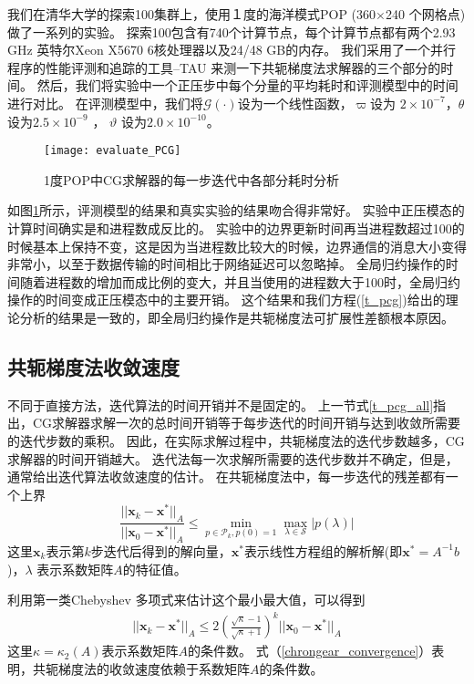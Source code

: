  
我们在清华大学的探索100集群上，使用１度的海洋模式POP (360$\times$240 个网格点)做了一系列的实验。 
探索100包含有740个计算节点，每个计算节点都有两个2.93 GHz 英特尔Xeon X5670 6核处理器以及24/48 GB的内存。 
我们采用了一个并行程序的性能评测和追踪的工具--TAU\cite{shende2006tau} 来测一下共轭梯度法求解器的三个部分的时间。 
然后，我们将实验中一个正压步中每个分量的平均耗时和评测模型中的时间进行对比。 
在评测模型中，我们将$\mathcal{G}(\cdot)$设为一个线性函数，$\varpi$设为 $2\times 10^{-7}$，$\theta$ 设为$2.5\times 10^{-9}$ ， $\vartheta$  设为$2.0\times 10^{-10}$。 


\begin{figure}[ht]
\centering
\texttt{[image: evaluate\_PCG]}
\caption[] {1度POP中CG求解器的每一步迭代中各部分耗时分析\label{fig:pcg_ratio}}
\end{figure}
如图\ref{fig:pcg_ratio}所示，评测模型的结果和真实实验的结果吻合得非常好。 
实验中正压模态的计算时间确实是和进程数成反比的。 
实验中的边界更新时间再当进程数超过100的时候基本上保持不变，这是因为当进程数比较大的时候，边界通信的消息大小变得非常小，以至于数据传输的时间相比于网络延迟可以忽略掉。 
全局归约操作的时间随着进程数的增加而成比例的变大，并且当使用的进程数大于100时，全局归约操作的时间变成正压模态中的主要开销。 
这个结果和我们方程(\ref{t_pcg})给出的理论分析的结果是一致的，即全局归约操作是共轭梯度法可扩展性差额根本原因。 

\subsection{共轭梯度法收敛速度} \label{solver:CG:convergence_rate}

不同于直接方法，迭代算法的时间开销并不是固定的。
上一节式\ref{t_pcg_all}指出，CG求解器求解一次的总时间开销等于每步迭代的时间开销与达到收敛所需要的迭代步数的乘积。
因此，在实际求解过程中，共轭梯度法的迭代步数越多，CG求解器的时间开销越大。 
迭代法每一次求解所需要的迭代步数并不确定，但是，通常给出迭代算法收敛速度的估计。
在共轭梯度法中，每一步迭代的残差都有一个上界\cite{Liesen2004}
\begin{equation}
\frac{||\textbf{x}_k-\textbf{x}^*||_A }{||\textbf{x}_0-\textbf{x}^*||_A}  \le \min_{p\in \mathcal{P}_k, p(0) = 1 }\max_{\lambda \in \mathcal{S}} |p(\lambda)| \label{PcgConvergeRate}
\end{equation}
这里$\textbf{x}_k$表示第$k$步迭代后得到的解向量，$\textbf{x}^*$表示线性方程组的解析解(即$\textbf{x}^* = A^{-1}b$)，$\lambda$ 表示系数矩阵$A$的特征值。

利用第一类Chebyshev 多项式来估计这个最小最大值，可以得到 
\begin{align}
\label{chrongear_convergence}
||\textbf{x}_k-\textbf{x}^*||_A \le  2 (\frac{\sqrt{\kappa}-1}{\sqrt{\kappa}+1})^k ||\textbf{x}_0-\textbf{x}^*||_A
\end{align}
这里$\kappa =  \kappa_2(A)$表示系数矩阵$A$的条件数。
式（\ref{chrongear_convergence}）表明，共轭梯度法的收敛速度依赖于系数矩阵$A$的条件数。

